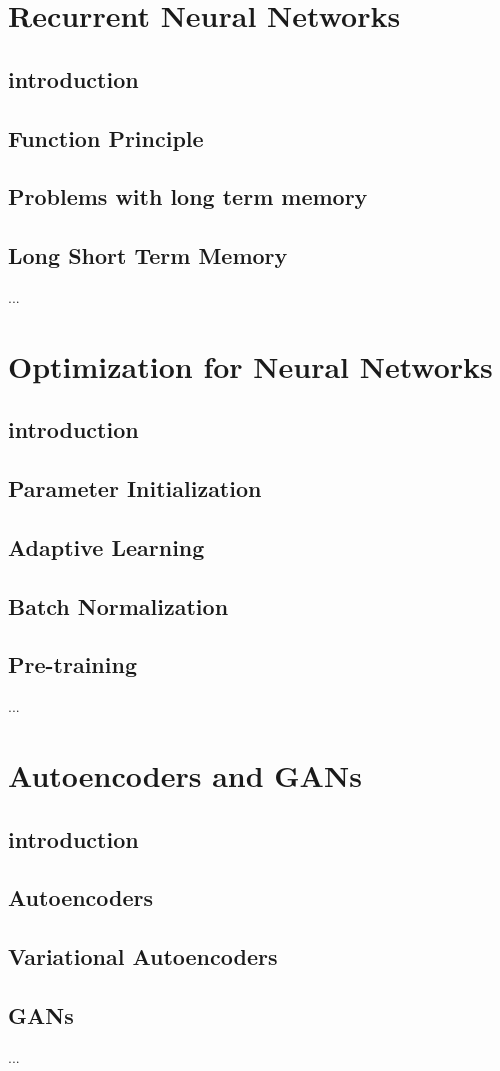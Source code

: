 \documentclass[a4paper,10pt,titlepage]{report}
\begin{document}
\newpage
\section{Recurrent Neural Networks}
\subsection{introduction}
\subsection{Function Principle}
\subsection{Problems with long term memory}
\subsection{Long Short Term Memory}
...

\newpage
\section{Optimization for Neural Networks}
\subsection{introduction}
\subsection{Parameter Initialization}
\subsection{Adaptive Learning}
\subsection{Batch Normalization}
\subsection{Pre-training}
...

\newpage
\section{Autoencoders and GANs}
\subsection{introduction}
\subsection{Autoencoders}
\subsection{Variational Autoencoders}
\subsection{GANs}
...
\end{document}
